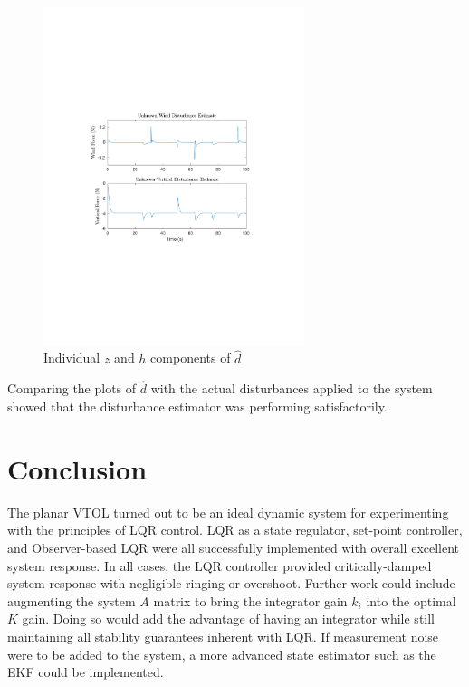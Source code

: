 \documentclass[dvips,12pt]{article}
\begin{document}
\begin{figure}[h] %
   \centering
   \includegraphics[trim = {4cm 8.5cm 4cm 8.5cm},clip,width=3.0in]{dhat.pdf}
   \caption{Individual $z$ and $h$ components of $\hat{d}$}
   \label{fig:dhat}
\end{figure}

Comparing the plots of $\hat{d}$ with the actual disturbances applied to the system showed that the disturbance estimator was performing satisfactorily.

\section{Conclusion}
The planar VTOL turned out to be an ideal dynamic system for experimenting with the principles of LQR control.  LQR as a state regulator, set-point controller, and Observer-based LQR were all successfully implemented with overall excellent system response.  In all cases, the LQR controller provided critically-damped system response with negligible ringing or overshoot. Further work could include augmenting the system $A$ matrix to bring the integrator gain $k_i$ into the optimal $K$ gain.  Doing so would add the advantage of having an integrator while still maintaining all stability guarantees inherent with LQR. If measurement noise were to be added to the system, a more advanced state estimator such as the EKF could be implemented. 
\end{document}
